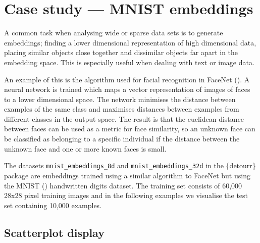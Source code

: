 \pagebreak

\hypertarget{ch:casestudy}{%
\section{Case study --- MNIST embeddings}\label{ch:casestudy}}

A common task when analysing wide or sparse data sets is to generate
embeddings; finding a lower dimensional representation of high
dimensional data, placing similar objects close together and dissimilar
objects far apart in the embedding space. This is especially useful when
dealing with text or image data.

An example of this is the algorithm used for facial recognition in
FaceNet (\citet{schroff2015facenet}). A neural network is trained which
maps a vector representation of images of faces to a lower dimensional
space. The network minimises the distance between examples of the same
class and maximises distances between examples from different classes in
the output space. The result is that the euclidean distance between
faces can be used as a metric for face similarity, so an unknown face
can be classified as belonging to a specific individual if the distance
between the unknown face and one or more known faces is small.

The datasets \texttt{mnist\_embeddings\_8d} and
\texttt{mnist\_embeddings\_32d} in the \{detourr\} package are
embeddings trained using a similar algorithm to FaceNet but using the
MNIST (\citet{lecun1998mnist}) handwritten digits dataset. The training
set consists of 60,000 28x28 pixel training images and in the following
examples we visualise the test set containing 10,000 examples.

\hypertarget{scatterplot-display}{%
\subsection{Scatterplot display}\label{scatterplot-display}}

